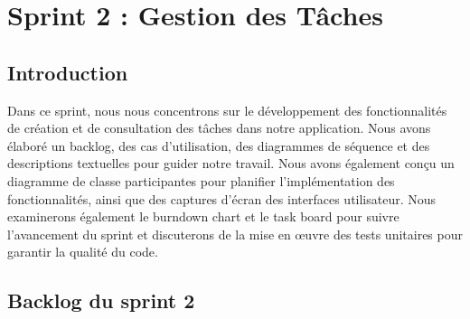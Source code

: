 
\chapter{  Sprint 2 : Gestion des Tâches }

\section*{Introduction}

Dans ce sprint, nous nous concentrons sur le développement des fonctionnalités de création et de consultation des tâches dans notre application. Nous avons élaboré un backlog, des cas d'utilisation, des diagrammes de séquence et des descriptions textuelles pour guider notre travail. Nous avons également conçu un diagramme de classe participantes pour planifier l'implémentation des fonctionnalités, ainsi que des captures d'écran des interfaces utilisateur. Nous examinerons également le burndown chart et le task board pour suivre l'avancement du sprint et discuterons de la mise en œuvre des tests unitaires pour garantir la qualité du code.

\section{Backlog du sprint 2}


